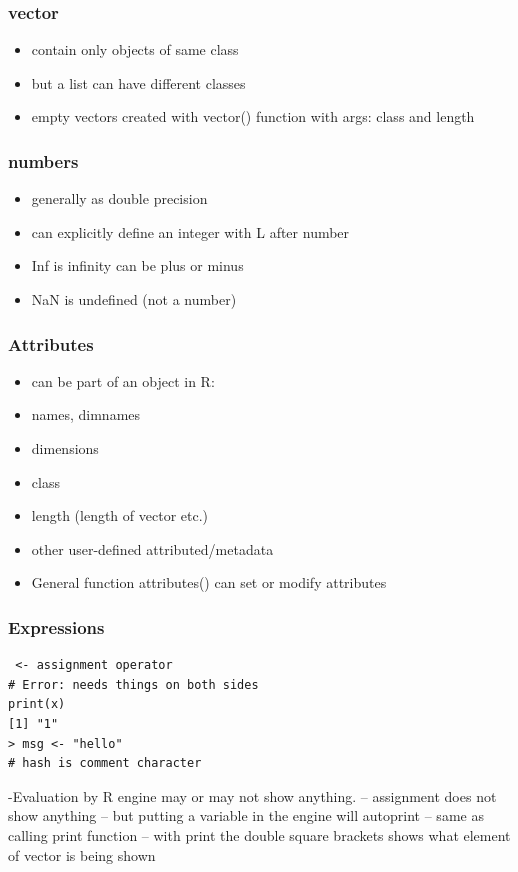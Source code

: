 \documentclass[11pt]{article}
\begin{document}
\subsubsection{vector}
\label{sec-1-4-2}

\begin{itemize}
\item contain only objects of same class
\item but a list can have different classes
\item empty vectors created with vector() function with args: class and length
\end{itemize}
\subsubsection{numbers}
\label{sec-1-4-3}

\begin{itemize}
\item generally as double precision
\item can explicitly define an integer with L after number
\item Inf is infinity can be plus or minus
\item NaN is undefined (not a number)
\end{itemize}
\subsubsection{Attributes}
\label{sec-1-4-4}

\begin{itemize}
\item can be part of an object in R:
\item names, dimnames
\item dimensions
\item class
\item length (length of vector etc.)
\item other user-defined attributed/metadata
\item General function attributes() can set or modify attributes
\end{itemize}
\subsubsection{Expressions}
\label{sec-1-4-5}


\begin{verbatim}
 <- assignment operator
# Error: needs things on both sides
print(x)
[1] "1"
> msg <- "hello"
# hash is comment character
\end{verbatim}
-Evaluation by R engine may or may not show anything.
-- assignment does not show anything
-- but putting a variable in the engine will autoprint
-- same as calling print function
-- with print the double square brackets shows what element of vector is being
shown
\end{document}
